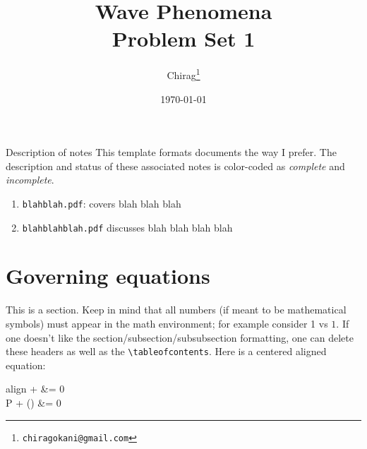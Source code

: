 \documentclass[12pt]{article}
\title{Wave Phenomena\\Problem Set 1}
\author{Chirag\footnote{\texttt{chiragokani@gmail.com}}} %
\date{\today}
\numberwithin{equation}{section}
\renewcommand{\vec}[1]{\symbf{#1}}
\newcommand{\divergence}{\symbf{\nabla}\cdot}
\newcommand{\grad}{\symbf{\nabla}}
\begin{document}
\maketitle 	
\begin{graytext}{Description of notes}
	This template formats documents the way I prefer. The description and status of these associated notes is color-coded as \color{cyan}\textit{complete} \color{black} and  \color{magenta}\textit{incomplete}\color{black}.
	\begin{enumerate}[label=(\alph*)]
		\item \color{cyan}\texttt{blahblah.pdf}: covers blah blah blah \color{black} 
		\item \color{magenta}\texttt{blahblahblah.pdf} discusses blah blah blah blah \color{black} 
	\end{enumerate}
\end{graytext}
\section{Governing equations}
This is a section. Keep in mind that all numbers (if meant to be  mathematical symbols) must appear in the math environment; for example consider 1 vs $1$. If one doesn't like the section/subsection/subsubsection formatting, one can delete these headers as well as the \texttt{\textbackslash tableofcontents}. Here is a centered aligned equation:
\begin{center}
	\begin{empheq}[box = \eq]{align}
	\divergence \vec{u} +  &= 0 \label{co}\\
\grad P + (\rho \vec{u}) &= 0 \label{mo}
	\end{empheq}
\end{center}
\end{document}
